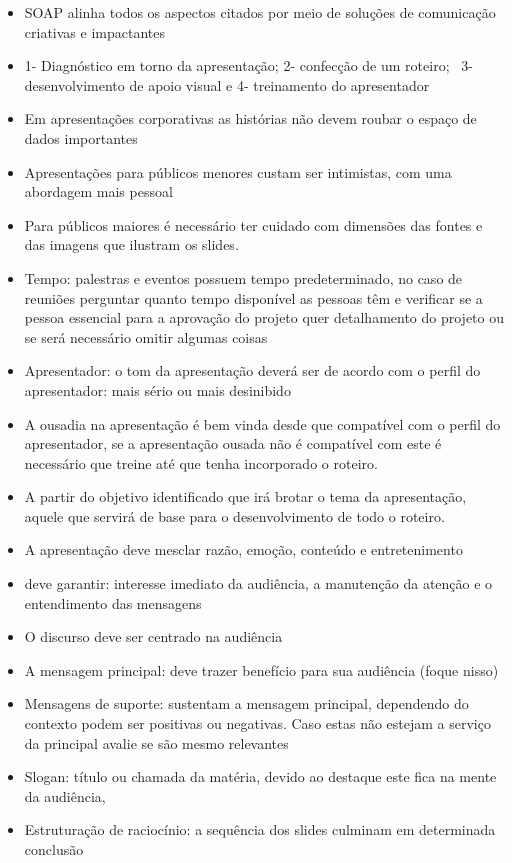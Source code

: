 \begin{itemize}
    \item SOAP alinha todos os aspectos citados por meio de soluções de comunicação criativas e impactantes
    \item 1- Diagnóstico em torno da apresentação; 2- confecção de um roteiro;  3- desenvolvimento de apoio visual e 4- treinamento do apresentador
    \item Em apresentações corporativas as histórias não devem roubar o espaço de dados importantes
    \item Apresentações para públicos menores custam ser intimistas, com uma abordagem mais pessoal
    \item Para públicos maiores é necessário ter cuidado com dimensões das fontes e das imagens que ilustram os slides.
    \item Tempo: palestras e eventos possuem tempo predeterminado, no caso de reuniões perguntar quanto tempo disponível as pessoas têm e verificar se a pessoa essencial para a aprovação do projeto quer detalhamento do projeto ou se será necessário omitir algumas coisas
    \item Apresentador: o tom da apresentação deverá ser de acordo com o perfil do apresentador: mais sério ou mais desinibido
    \item A ousadia na apresentação é bem vinda desde que compatível com o perfil do apresentador, se a apresentação ousada não é compatível com este é necessário que treine até que tenha incorporado o roteiro.
    \item A partir do objetivo identificado que irá brotar o tema da apresentação, aquele que servirá de base para o desenvolvimento de todo o roteiro.
    \item A apresentação deve mesclar razão, emoção, conteúdo e entretenimento
    \item deve garantir: interesse imediato da audiência, a manutenção da atenção e o entendimento das mensagens
    \item  O discurso deve ser centrado na audiência
    \item A mensagem principal: deve trazer benefício para sua audiência (foque nisso)
    \item Mensagens de suporte: sustentam a mensagem principal, dependendo do contexto podem ser positivas ou negativas. Caso estas não estejam a serviço da principal avalie se são mesmo relevantes
    \item Slogan: título ou chamada da matéria, devido ao destaque este fica na mente da audiência,
    \item Estruturação de raciocínio: a sequência dos slides culminam em determinada conclusão

\end{itemize}
